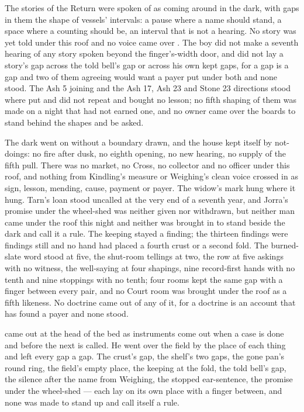 The stories of the Return were spoken of as coming around in the dark, with gaps in them the shape of vessels' intervals: a pause where a name should stand, a space where a counting should be, an interval that is not a hearing. No story was yet told under this roof and no voice came over . The boy did not make a seventh hearing of any story spoken beyond the finger's-width door, and did not lay a story's gap across the told bell's gap or across his own kept gaps, for a gap is a gap and two of them agreeing would want a payer put under both and none stood. The Ash 5 joining and the Ash 17, Ash 23 and Stone 23 directions stood where put and did not repeat and bought no lesson; no fifth shaping of them was made on a night that had not earned one, and no owner came over the boards to stand behind the shapes and be asked.

The dark went on without a boundary drawn, and the house kept itself by not-doings: no fire after dusk, no eighth opening, no new hearing, no supply of the fifth pull. There was no market, no Cross, no collector and no officer under this roof, and nothing from Kindling's measure or Weighing's clean voice crossed in as sign, lesson, mending, cause, payment or payer. The widow's mark hung where it hung. Tarn's loan stood uncalled at the very end of a seventh year, and Jorra's promise under the wheel-shed was neither given nor withdrawn, but neither man came under the roof this night and neither was brought in to stand beside the dark and call it a rule. The keeping stayed a finding; the thirteen findings were findings still and no hand had placed a fourth crust or a second fold. The burned-slate word stood at five, the shut-room tellings at two, the row at five askings with no witness, the well-saying at four shapings, nine record-first hands with no tenth and nine stoppings with no tenth; four rooms kept the same gap with a finger between every pair, and no Court room was brought under the roof as a fifth likeness. No doctrine came out of any of it, for a doctrine is an account that has found a payer and none stood.

\scenebreak

 came out at the head of the bed as instruments come out when a case is done and before the next is called. He went over the field by the place of each thing and left every gap a gap. The crust's gap, the shelf's two gaps, the gone pan's round ring, the field's empty place, the keeping at the fold, the told bell's gap, the silence after the name from Weighing, the stopped ear-sentence, the promise under the wheel-shed --- each lay on its own place with a finger between, and none was made to stand up and call itself a rule.

